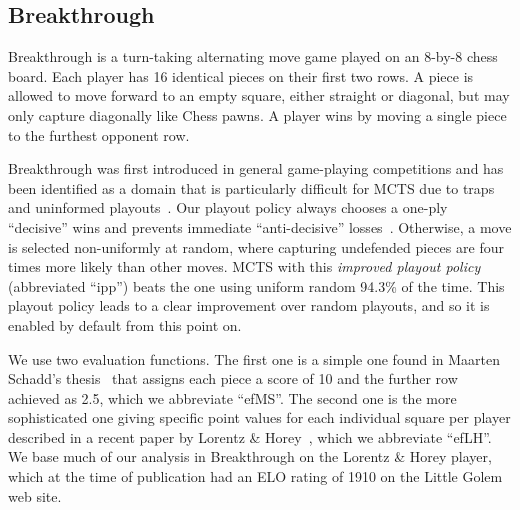 \documentclass{article}
\newcommand{\Update}{{\sc Update}}
\begin{document}
\subsection{Breakthrough}
\label{sec:bt}

Breakthrough is a turn-taking alternating move game played on an 8-by-8 chess board. Each player 
has 16 identical pieces on their first two rows. 
A piece is allowed to move forward to an empty square, either straight or diagonal, but may only 
capture diagonally like Chess pawns. A player wins by moving a single piece to the furthest opponent row. 

Breakthrough was first introduced in general game-playing competitions and has been identified as a domain 
that is particularly difficult for MCTS due to traps and uninformed playouts~\cite{Gudmindsson13Sufficiency}. 
Our playout policy always chooses a one-ply ``decisive'' wins and prevents immediate ``anti-decisive'' 
losses~\cite{Teytaud10On}.
Otherwise, a move is selected non-uniformly at random, where capturing undefended pieces are four times more
likely than other moves. 
MCTS with this {\it improved playout policy} (abbreviated ``ipp'') beats the one using uniform random 
94.3\% of the time. This playout policy leads to a clear improvement over random playouts, and so it is enabled 
by default from this point on.

We use two evaluation functions. The first one is a simple one found in Maarten Schadd's thesis~\cite{Schadd11PhdThesis} 
that assigns each piece a score of 10 and the further row achieved as 2.5, which we abbreviate ``efMS''. The second 
one is the more sophisticated one giving specific point values for each individual square per player 
described in a recent paper by Lorentz \& Horey~\cite{Lorentz13Breakthrough}, which we abbreviate ``efLH''. 
We base much of our analysis in Breakthrough on the Lorentz \& Horey player, which 
at the time of publication had an ELO rating of 1910 on the Little Golem web site. 


\end{document}

